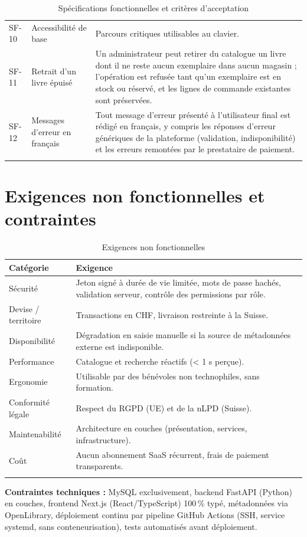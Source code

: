 \documentclass[10pt, a4paper]{article}
\begin{document}
\begin{longtable}{@{}L{1.1cm}L{5.5cm}L{7.9cm}@{}}
SF-10 & Accessibilité de base & Parcours critiques utilisables au clavier. \\
SF-11 & Retrait d'un livre épuisé & Un administrateur peut retirer du catalogue un livre dont il ne reste aucun exemplaire dans aucun magasin ; l'opération est refusée tant qu'un exemplaire est en stock ou réservé, et les lignes de commande existantes sont préservées. \\
SF-12 & Messages d'erreur en français & Tout message d'erreur présenté à l'utilisateur final est rédigé en français, y compris les réponses d'erreur génériques de la plateforme (validation, indisponibilité) et les erreurs remontées par le prestataire de paiement. \\
\bottomrule
\caption{Spécifications fonctionnelles et critères d'acceptation}
\end{longtable}

\section{Exigences non fonctionnelles et contraintes}

\begin{longtable}{@{}L{2.8cm}L{10.7cm}@{}}
\toprule
\textbf{Catégorie} & \textbf{Exigence} \\
\midrule
\endhead
Sécurité & Jeton signé à durée de vie limitée, mots de passe hachés, validation serveur, contrôle des permissions par rôle. \\
Devise / territoire & Transactions en CHF, livraison restreinte à la Suisse. \\
Disponibilité & Dégradation en saisie manuelle si la source de métadonnées externe est indisponible. \\
Performance & Catalogue et recherche réactifs (< 1 s perçue). \\
Ergonomie & Utilisable par des bénévoles non technophiles, sans formation. \\
Conformité légale & Respect du RGPD (UE) et de la nLPD (Suisse). \\
Maintenabilité & Architecture en couches (présentation, services, infrastructure). \\
Coût & Aucun abonnement SaaS récurrent, frais de paiement transparents. \\
\bottomrule
\caption{Exigences non fonctionnelles}
\end{longtable}

\noindent\textbf{Contraintes techniques :} MySQL exclusivement, backend FastAPI (Python) en
couches, frontend Next.js (React/TypeScript) 100\,\% typé, métadonnées via OpenLibrary,
déploiement continu par pipeline GitHub Actions (SSH, service systemd, sans conteneurisation),
tests automatisés avant déploiement.
\end{document}
